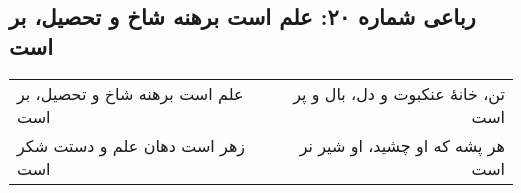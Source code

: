 \begin{center}
\section*{رباعی شماره ۲۰: علم است برهنه شاخ و تحصیل، بر است}
\label{sec:020}
\begin{longtable}{l p{0.5cm} r}
علم است برهنه شاخ و تحصیل، بر است
&&
تن، خانهٔ عنکبوت و دل، بال و پر است
\\
زهر است دهان علم و دستت شکر است
&&
هر پشه که او چشید، او شیر نر است
\\
\end{longtable}
\end{center}
